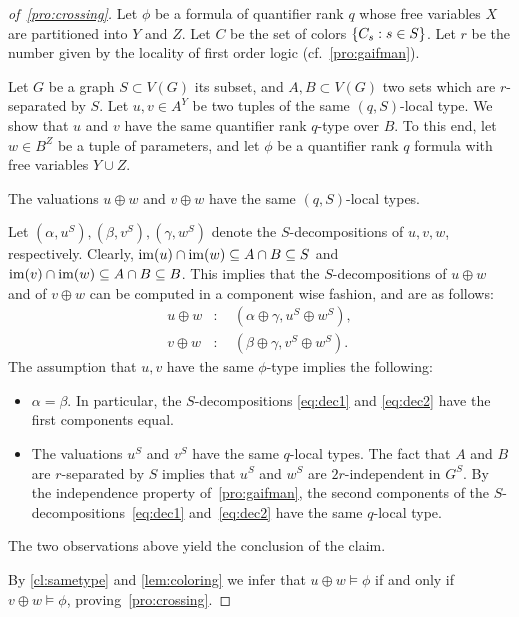 \begin{proof}[of~\cref{pro:crossing}]
Let $\phi$ be a formula
	of  quantifier rank $q$
   whose free variables $X$ are partitioned into $Y$ and $Z$.
  Let $C$ be the set of colors $\{C_s:s\in S\}$.
  Let $r$ be the number given by the locality of first order logic (cf.~\cref{pro:gaifman}).
  
Let $G$ be a graph $S\subset V(G)$ its subset, and $A,B\subset V(G)$  two sets which are $r$-separated by $S$. Let $u,v\in A^Y$ be two tuples of the same $(q,S)$-local type. We show that $u$ and $v$ have the same quantifier rank $q$-type over $B$. To this end, let $w\in B^Z$ be a tuple of parameters,
and let $\phi$ be a quantifier rank $q$ formula with free variables $ Y\cup Z$.
	

\begin{claim}\label{cl:sametype}
The valuations $u\oplus w$ and $v\oplus w$ have the same 
$(q,S)$-local types.  
\end{claim}
\begin{clproof}
Let $(\alpha,u^S),(\beta,v^S),(\gamma,w^S)$ denote the $S$-decompositions of  $u,v,w$, respectively. 
Clearly, $\mathrm{im}(u)\cap\mathrm{im}(w)\subseteq A\cap B\subseteq S$ and $\mathrm{im}(v)\cap \mathrm{im} (w)\subseteq A\cap B\subseteq B$.
This implies that the $S$-decompositions of $u\oplus w$
and of  $v\oplus w$ can be computed in a component wise fashion, and are as follows:
\begin{align}
u\oplus w &\colon \quad (\alpha\oplus \gamma,  u^S\oplus w^S)\label{eq:dec1},\\  
v\oplus w &\colon \quad (\beta\oplus \gamma, v^S\oplus w^S)\label{eq:dec2}.
\end{align}
The assumption that $u,v$ have the same $\phi$-type implies the following:

\begin{itemize}
  \item  $\alpha=\beta$.
  In particular, the $S$-decompositions
  \eqref{eq:dec1} and \eqref{eq:dec2}  have the first components equal.
  
    \item The valuations $u^S$ and  $v^S$ have 
  the same $q$-local types.
The fact that $A$ and $B$ are $r$-separated by $S$ implies that $u^S$ and $w^S$
are  $2r$-independent in $G^S$.
  By the independence property of~\cref{pro:gaifman}, the second components of the $S$-decompositions~\eqref{eq:dec1} and~\eqref{eq:dec2}
  have the same $q$-local type. 
\end{itemize}
The two observations above yield the conclusion of the claim.
\end{clproof}
By \cref{cl:sametype} and \cref{lem:coloring} we infer that $u\oplus w\models \phi$ if and only if $v\oplus w\models 
\phi$, proving~\cref{pro:crossing}.
\end{proof}